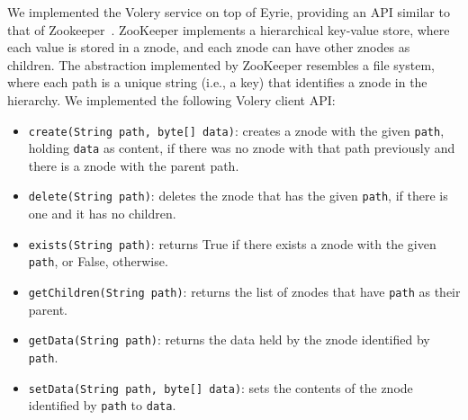 \documentclass[10pt, conference, compsocconf, letterpaper]{IEEEtranv17}
\begin{document}
We implemented the Volery service on top of Eyrie, providing an API similar to that of Zookeeper~\cite{ZOO2010}. 
%
ZooKeeper implements a hierarchical key-value store, where each value is stored in a znode, and each znode can have other znodes as children. 
The abstraction implemented by ZooKeeper resembles a file system, where each path is a unique string (i.e., a key) that identifies a znode in the hierarchy. 
We implemented the following Volery client API:

\begin{itemize}

\item \verb#create(String path, byte[] data)#: creates a znode with the given \verb#path#, holding \verb#data# as content, if there was no znode with that path previously and there is a znode with the parent path.

\item \verb#delete(String path)#: deletes the znode that has the given \verb#path#, if there is one and it has no children.

\item \verb#exists(String path)#: returns True if there exists a znode with the given \verb#path#, or False, otherwise.

\item \verb#getChildren(String path)#: returns the list of znodes that have \verb#path# as their parent.

\item \verb#getData(String path)#: returns the data held by the znode identified by \verb#path#.

\item \verb#setData(String path, byte[] data)#: sets the contents of the znode identified by \verb#path# to \verb#data#.

\end{itemize}

\end{document}
